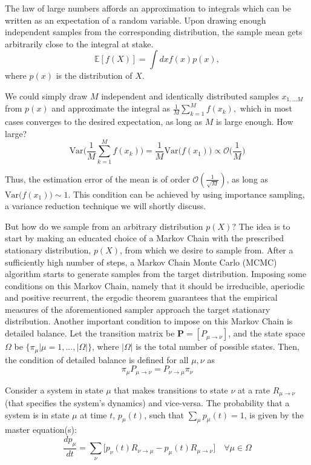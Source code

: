 The law of large numbers affords an approximation to integrals which can be written as an expectation of a random variable. Upon drawing enough independent samples from the corresponding distribution, the sample mean gets arbitrarily close to the integral at stake.
\begin{equation}\label{eq:int_mean}
\mathbb{E} [f(X)] = \int dx f(x) p(x),
\end{equation}
where $p(x)$ is the distribution of $X$. 

We could simply draw $M$ independent and identically distributed samples $x_{1,...M}$ from $p(x)$ and approximate the integral as
$
\frac{1}{M} \sum_{k=1}^M f (x_k) , 
$
 which in most cases converges to the desired expectation, as long as $M$ is large enough. How large?
\begin{equation}\label{eq:variance}
\text{Var}\bigg( \frac{1}{M} \sum_{k=1}^M f(x_k) \bigg) = \frac{1}{M} \text{Var}\bigg( f(x_1) \bigg) \propto \mathcal{O}\bigg(\frac{1}{M}\bigg)
\end{equation}

Thus, the estimation error of the mean is of order $\mathcal{O}(\frac{1}{\sqrt{M}})$, as long as $\text{Var}\big( f(x_1) \big) \sim 1$. This condition can be achieved by using importance sampling, a variance reduction technique we will shortly discuss.

But how do we sample from an arbitrary distribution $p(X)$? The idea is to start by making an educated choice of a Markov Chain with the prescribed stationary distribution, $p(X)$, from which we desire to sample from. After a sufficiently high number of steps, a Markov Chain Monte Carlo (MCMC) algorithm starts to generate samples from the target distribution. Imposing some conditions on this Markov Chain, namely that it should be irreducible, aperiodic and positive recurrent, the ergodic theorem guarantees that the empirical measures of the aforementioned sampler approach the target stationary distribution. Another important condition to impose on this Markov Chain is detailed balance. Let the transition matrix be $\bm P = [P_{\mu \rightarrow \nu}]$, and the state space $\Omega$ be $\{\pi_\mu | \mu=1, ..., |\Omega| \}$, where $|\Omega|$ is the total number of possible states. Then, the condition of detailed balance is defined for all $\mu, \nu$ as
\begin{equation}\label{eq:detBal}
\pi_\mu P_{\mu \rightarrow \nu} = P_{\nu \rightarrow \mu} \pi_\nu
\end{equation}

Consider a system in state $\mu$ that makes transitions to state $\nu$ at a rate $R_{\mu \rightarrow  \nu}$ (that specifies the system's dynamics) and vice-versa.
The probability that a system is in state $\mu$ at time $t$, $p_\mu (t)$, such that $\sum_\mu p_\mu (t) = 1$, is given by the master equation(s):
\begin{equation}\label{eq:master}
\frac{d p_\mu}{dt} = \sum_\nu \big[ p_\nu (t) R_{\nu \rightarrow \mu} - p_\mu (t) R_{\mu \rightarrow \nu} \big] \quad \forall \mu \in \Omega
\end{equation}


